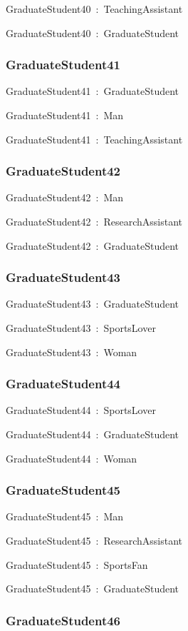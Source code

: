 \documentclass{article}
\begin{document}
GraduateStudent40~:~TeachingAssistant

GraduateStudent40~:~GraduateStudent

\subsubsection*{GraduateStudent41}

GraduateStudent41~:~GraduateStudent

GraduateStudent41~:~Man

GraduateStudent41~:~TeachingAssistant

\subsubsection*{GraduateStudent42}

GraduateStudent42~:~Man

GraduateStudent42~:~ResearchAssistant

GraduateStudent42~:~GraduateStudent

\subsubsection*{GraduateStudent43}

GraduateStudent43~:~GraduateStudent

GraduateStudent43~:~SportsLover

GraduateStudent43~:~Woman

\subsubsection*{GraduateStudent44}

GraduateStudent44~:~SportsLover

GraduateStudent44~:~GraduateStudent

GraduateStudent44~:~Woman

\subsubsection*{GraduateStudent45}

GraduateStudent45~:~Man

GraduateStudent45~:~ResearchAssistant

GraduateStudent45~:~SportsFan

GraduateStudent45~:~GraduateStudent

\subsubsection*{GraduateStudent46}
\end{document}
